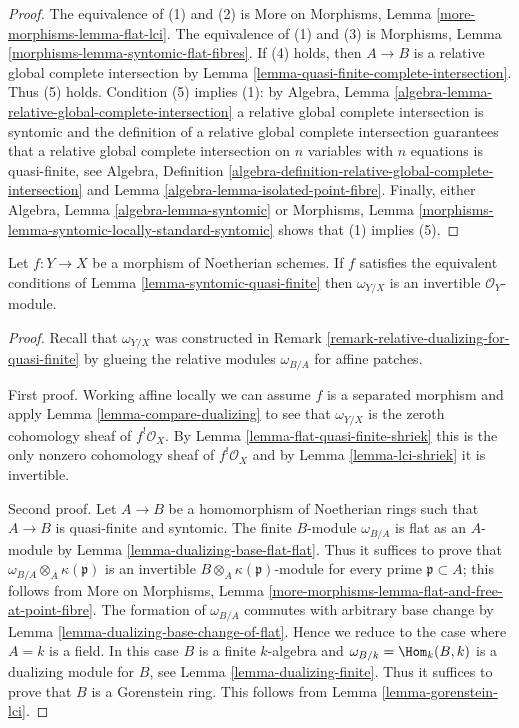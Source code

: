 \begin{proof}
The equivalence of (1) and (2) is
More on Morphisms, Lemma \ref{more-morphisms-lemma-flat-lci}.
The equivalence of (1) and (3) is 
Morphisms, Lemma \ref{morphisms-lemma-syntomic-flat-fibres}.
If (4) holds, then $A \to B$ is a relative global complete intersection by
Lemma \ref{lemma-quasi-finite-complete-intersection}. Thus (5) holds.
Condition (5) implies (1):
by
Algebra, Lemma \ref{algebra-lemma-relative-global-complete-intersection}
a relative global complete intersection is syntomic and
the definition of a relative global complete intersection
guarantees that a relative global complete intersection on
$n$ variables with $n$ equations is quasi-finite, see
Algebra, Definition
\ref{algebra-definition-relative-global-complete-intersection} and
Lemma \ref{algebra-lemma-isolated-point-fibre}.
Finally, either Algebra, Lemma \ref{algebra-lemma-syntomic} or
Morphisms, Lemma \ref{morphisms-lemma-syntomic-locally-standard-syntomic}
shows that (1) implies (5).
\end{proof}

\begin{lemma}
\label{lemma-dualizing-syntomic-quasi-finite}
Let $f : Y \to X$ be a morphism of Noetherian schemes. If $f$
satisfies the equivalent conditions of Lemma \ref{lemma-syntomic-quasi-finite}
then $\omega_{Y/X}$ is an invertible $\mathcal{O}_Y$-module.
\end{lemma}

\begin{proof}
Recall that $\omega_{Y/X}$ was constructed in 
Remark \ref{remark-relative-dualizing-for-quasi-finite}
by glueing the relative modules $\omega_{B/A}$ for affine patches.

\medskip\noindent
First proof. Working affine locally we can assume $f$ is a separated
morphism and apply Lemma \ref{lemma-compare-dualizing} to see that
$\omega_{Y/X}$ is the zeroth cohomology sheaf of $f^!\mathcal{O}_X$.
By Lemma \ref{lemma-flat-quasi-finite-shriek} this is the only
nonzero cohomology sheaf of $f^!\mathcal{O}_X$ and by
Lemma \ref{lemma-lci-shriek} it is invertible.

\medskip\noindent
Second proof. Let $A \to B$ be a homomorphism of Noetherian rings
such that $A \to B$ is quasi-finite and syntomic.
The finite $B$-module $\omega_{B/A}$ is flat as an $A$-module by
Lemma \ref{lemma-dualizing-base-flat-flat}.
Thus it suffices to prove that $\omega_{B/A} \otimes_A \kappa(\mathfrak p)$
is an invertible $B \otimes_A \kappa(\mathfrak p)$-module for
every prime $\mathfrak p \subset A$; this follows from
More on Morphisms, Lemma
\ref{more-morphisms-lemma-flat-and-free-at-point-fibre}.
The formation of $\omega_{B/A}$ commutes with arbitrary
base change by Lemma \ref{lemma-dualizing-base-change-of-flat}.
Hence we reduce to the case where $A = k$ is a field.
In this case $B$ is a finite $k$-algebra and
$\omega_{B/k} = \Hom_k(B, k)$ is a dualizing module for $B$, see
Lemma \ref{lemma-dualizing-finite}.
Thus it suffices to prove that $B$ is a Gorenstein ring.
This follows from Lemma \ref{lemma-gorenstein-lci}.
\end{proof}

